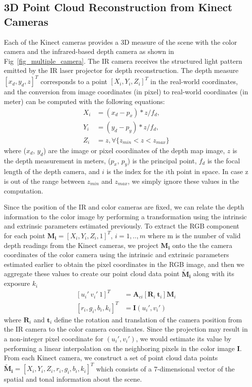 \subsection{3D Point Cloud Reconstruction from Kinect Cameras}
Each of the Kinect cameras provides a 3D measure of the scene with the color camera and the infrared-based depth camera as shown in Fig~\ref{fig_multiple_camera}. The IR camera receives the structured light pattern emitted by the IR laser projector for depth reconstruction. The depth measure $[x_d, y_d, z]^T$ corresponds to a point $[X_i,Y_i,Z_i]^T$ in the real-world coordinates, and the conversion from image coordinates (in pixel) to real-world coordinates (in meter) can be computed with the following equations:
\begin{equation}
\begin{split}
X_i &= (x_d - p_x) * z / f_d,\\
Y_i &= (y_d - p_y) * z / f_d, \\
Z_i &= z, \forall \{ z_{min}<z<z_{max}\}
\label{3D_kinect_color}
\end{split}
\end{equation}
where ($x_d$, $y_d$) are the image or pixel coordinates of the depth map image, $z$ is the depth measurement in meters, ($p_x$, $p_y$) is the principal point, $f_d$ is the focal length of the depth camera, and $i$ is the index for the $i$th point in space. In case z is out of the range between $z_{min}$ and $z_{max}$, we simply ignore these values in the computation.

Since the position of the IR and color cameras are fixed, we can relate the depth information to the color image by performing a transformation using the intrinsic and extrinsic parameters estimated previously. To extract the RGB component for each point $\mathbf{M_i} = [X_i, Y_i, Z_i, 1]^T$, $i=1,..,m$ where m is the number of valid depth readings from the Kinect cameras, we project $\mathbf{M_i}$ onto the the camera coordinates of the color camera using the intrinsic and extrinsic parameters estimated earlier to obtain the pixel coordinates in the RGB image, and then we aggregate these values to create our point cloud data point $\mathbf{\tilde{M}_{i}}$ along with its exposure $k_i$ 
\begin{equation}
\begin{split}
[u_i'~v_i'~1]^T &=  \mathbf{A}_{ci}[\mathbf{R}_i~\mathbf{t}_i]\mathbf{M}_i \\
[r_i, g_i, b_i, k_i]^T &= \mathbf{I}(u_i', v_i')
\label{eq_3D_rgb_lookup}
\end{split}
\end{equation}
where $\mathbf{R}_i$ and $\mathbf{t}_i$ define the rotation and translation of the camera position from the IR camera to the color camera coordinates. Since the projection may result in a non-integer pixel coordinate for $(u_i', v_i')$, we would estimate its value by performing a linear interpolation on the neighboring pixels in the color image $\mathbf{I}$. From each Kinect camera, we construct a set of point cloud data points $\mathbf{\tilde{M}_{i}} = [X_i, Y_i, Z_i, r_i, g_i, b_i, k_i]^T$ which consists of a 7-dimensional vector of the spatial and tonal information about the scene.


